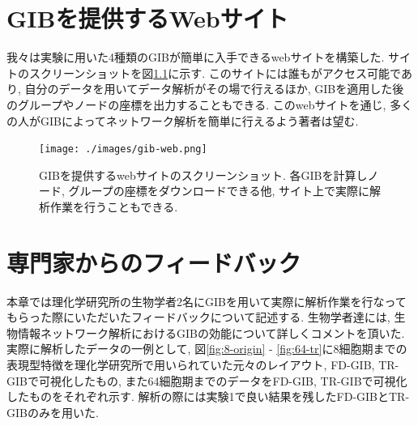 \documentclass{kuee}
\begin{document}
\chapter{GIBを提供するWebサイト}
\label{chap:website}
我々は実験に用いた4種類のGIBが簡単に入手できるwebサイト\cite{gibweb}を構築した.
サイトのスクリーンショットを図\ref{fig:website}に示す.
このサイトには誰もがアクセス可能であり, 自分のデータを用いてデータ解析がその場で行えるほか, GIBを適用した後のグループやノードの座標を出力することもできる.
このwebサイトを通じ, 多くの人がGIBによってネットワーク解析を簡単に行えるよう著者は望む.

\begin{figure}[t]
  \begin{center}
  \texttt{[image: ./images/gib-web.png]}
  \caption{GIBを提供するwebサイトのスクリーンショット. 各GIBを計算しノード, グループの座標をダウンロードできる他, サイト上で実際に解析作業を行うこともできる. \label{fig:website}}
  \end{center}
\end{figure}

\chapter{専門家からのフィードバック}
\label{chap:feedback}

本章では理化学研究所の生物学者2名にGIBを用いて実際に解析作業を行なってもらった際にいただいたフィードバックについて記述する.
生物学者達には, 生物情報ネットワーク解析におけるGIBの効能について詳しくコメントを頂いた.
実際に解析したデータの一例として, 図\ref{fig:8-origin} - \ref{fig:64-tr}に8細胞期までの表現型特徴を理化学研究所で用いられていた元々のレイアウト, FD-GIB, TR-GIBで可視化したもの, また64細胞期までのデータをFD-GIB, TR-GIBで可視化したものをそれぞれ示す.
解析の際には実験1で良い結果を残したFD-GIBとTR-GIBのみを用いた.
\end{document}
